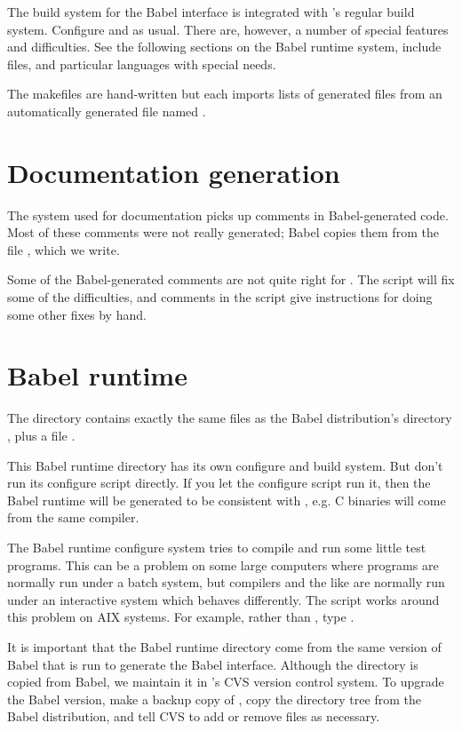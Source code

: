 The build system for the Babel interface is integrated with \hypre{}'s
regular build system.  Configure  and 
as usual.  There are, however, a number of special features and
difficulties.  See the following sections on the Babel runtime system,
include files, and particular languages with special needs.

The makefiles are hand-written but each imports lists of generated files
from an automatically generated file named .

\section{Documentation generation}

The  system used for \hypre{} documentation picks up
comments in Babel-generated code.  Most of these comments were not
really generated; Babel copies them from the file
, which we write.

Some of the Babel-generated comments are not quite right for
.  The script  will fix some of the
difficulties, and comments in the script give instructions for doing
some other fixes by hand.

\section{Babel runtime}

The directory  contains exactly the same files as the
Babel distribution's directory , plus a file
.

This Babel runtime directory has its own configure and build system.
But don't run its configure script directly.  If you let the \hypre{}
configure script run it, then the Babel runtime will be generated to
be consistent with \hypre{} , e.g. C binaries will come from the same
compiler.

The Babel runtime configure system tries to compile and run some
little test programs.  This can be a problem on some large computers
where programs are normally run under a batch system, but compilers
and the like are normally run under an interactive system which
behaves differently.  The script  works around this
problem on AIX systems.  For example, rather than , type
.

It is important that the Babel runtime directory come from the same
version of Babel that is run to generate the Babel interface.
Although the directory is copied from Babel, we maintain it in
\hypre{}'s CVS version control system.  To upgrade the Babel version,
make a backup copy of , copy the directory tree
from the Babel distribution, and tell CVS to add or remove files as
necessary.

